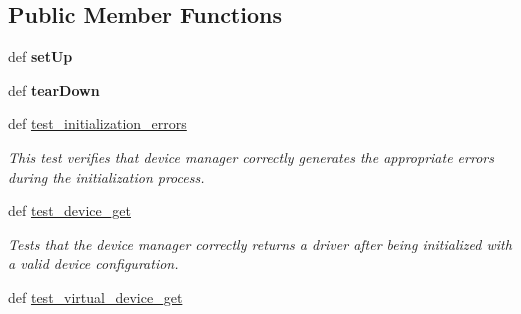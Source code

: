 \subsection*{Public Member Functions}
\begin{DoxyCompactItemize}
\item 
\hypertarget{classhwm_1_1hardware_1_1devices_1_1tests_1_1test__device__manager_1_1_test_device_manager_a8ed19949373e2e37989a0843854d2bcb}{def {\bfseries set\-Up}}\label{classhwm_1_1hardware_1_1devices_1_1tests_1_1test__device__manager_1_1_test_device_manager_a8ed19949373e2e37989a0843854d2bcb}

\item 
\hypertarget{classhwm_1_1hardware_1_1devices_1_1tests_1_1test__device__manager_1_1_test_device_manager_a3c7e6d508900ca180a2802511d96a5f0}{def {\bfseries tear\-Down}}\label{classhwm_1_1hardware_1_1devices_1_1tests_1_1test__device__manager_1_1_test_device_manager_a3c7e6d508900ca180a2802511d96a5f0}

\item 
\hypertarget{classhwm_1_1hardware_1_1devices_1_1tests_1_1test__device__manager_1_1_test_device_manager_a9e539fe3b61cd28b18f4b7116507d5d5}{def \hyperlink{classhwm_1_1hardware_1_1devices_1_1tests_1_1test__device__manager_1_1_test_device_manager_a9e539fe3b61cd28b18f4b7116507d5d5}{test\-\_\-initialization\-\_\-errors}}\label{classhwm_1_1hardware_1_1devices_1_1tests_1_1test__device__manager_1_1_test_device_manager_a9e539fe3b61cd28b18f4b7116507d5d5}

\begin{DoxyCompactList}\small\item\em This test verifies that device manager correctly generates the appropriate errors during the initialization process. \end{DoxyCompactList}\item 
\hypertarget{classhwm_1_1hardware_1_1devices_1_1tests_1_1test__device__manager_1_1_test_device_manager_a89ceeb02bff491be7ab1cde9c6fd6744}{def \hyperlink{classhwm_1_1hardware_1_1devices_1_1tests_1_1test__device__manager_1_1_test_device_manager_a89ceeb02bff491be7ab1cde9c6fd6744}{test\-\_\-device\-\_\-get}}\label{classhwm_1_1hardware_1_1devices_1_1tests_1_1test__device__manager_1_1_test_device_manager_a89ceeb02bff491be7ab1cde9c6fd6744}

\begin{DoxyCompactList}\small\item\em Tests that the device manager correctly returns a driver after being initialized with a valid device configuration. \end{DoxyCompactList}\item 
\hypertarget{classhwm_1_1hardware_1_1devices_1_1tests_1_1test__device__manager_1_1_test_device_manager_a51268cec94a7b3449464ddcd78d9cc10}{def \hyperlink{classhwm_1_1hardware_1_1devices_1_1tests_1_1test__device__manager_1_1_test_device_manager_a51268cec94a7b3449464ddcd78d9cc10}{test\-\_\-virtual\-\_\-device\-\_\-get}}\label{classhwm_1_1hardware_1_1devices_1_1tests_1_1test__device__manager_1_1_test_device_manager_a51268cec94a7b3449464ddcd78d9cc10}


\end{DoxyCompactItemize}
